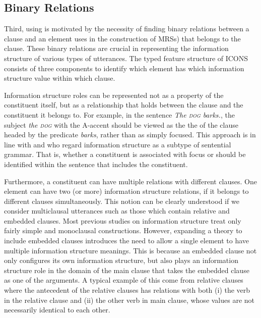 \subsection{Binary Relations}
\label{9:ssec:binary}


Third, using  is motivated by the necessity of finding
binary relations between a clause and an element uses in the
construction of MRSs) that belongs to the clause. These binary
relations are crucial in representing the information structure of
various types of utterances.  The typed feature structure of ICONS
consists of three components to identify which element has which
information structure value within which clause.


Information structure roles can be represented not as a property of
the constituent itself, but as a relationship that holds between the
clause and the constituent it belongs to. For example, in the 
sentence \textit{The \textsc{dog} barks.}, the subject \textit{the
  \textsc{dog}} with the A-accent should be viewed as the the  of
the clause headed by the predicate \textit{barks}, rather than as
simply focused.  This approach is in line with \citet{lambrecht:96}
and \citet{engdahl:vallduvi:96} who regard information structure as a
subtype of sentential grammar. That is, whether a
constituent is associated with focus or  should be identified
within the sentence that includes the constituent.


Furthermore, a constituent can have multiple relations with different
clauses. One element can have two (or more) information structure
relations, if it belongs to different clauses simultaneously.  This
notion can be clearly understood if we consider multiclausal
utterances such as those which contain relative and embedded clauses.
Most previous studies on information structure treat only fairly
simple and monoclausal constructions. However, expanding a theory to
include embedded clauses introduces the need to allow a single element
to have multiple information structure meanings.  This is because an
embedded clause not only configures its own information structure, but
also plays an information structure role in the domain of the main
clause that takes the embedded clause as one of the
arguments. A typical example of this come from
relative clauses where the antecedent of the relative clauses has
relations with both (i) the verb in the relative clause and (ii) the
other verb in main clause, whose values are not necessarily identical
to each other.



